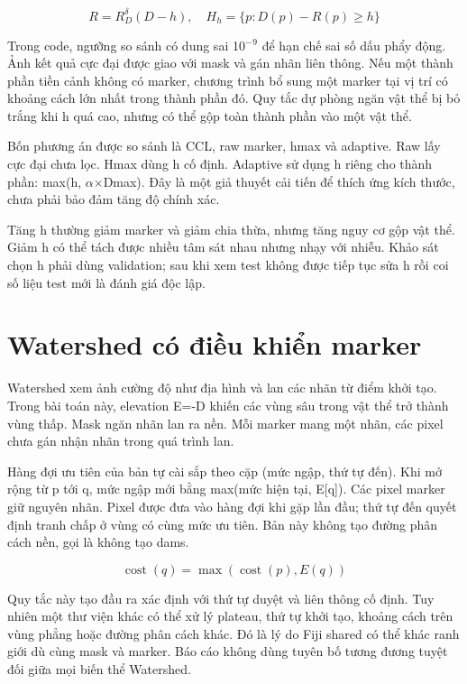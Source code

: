 \documentclass[12pt,a4paper,oneside]{report}
\begin{document}
\begin{equation}R=R_D^\delta(D-h),\quad H_h=\{p:D(p)-R(p)\geq h\}\end{equation}

Trong code, ngưỡng so sánh có dung sai 10\ensuremath{^-}\ensuremath{^9} để hạn chế sai số dấu phẩy động. Ảnh kết quả cực đại được giao với mask và gán nhãn liên thông. Nếu một thành phần tiền cảnh không có marker, chương trình bổ sung một marker tại vị trí có khoảng cách lớn nhất trong thành phần đó. Quy tắc dự phòng ngăn vật thể bị bỏ trắng khi h quá cao, nhưng có thể gộp toàn thành phần vào một vật thể.

Bốn phương án được so sánh là CCL, raw marker, hmax và adaptive. Raw lấy cực đại chưa lọc. Hmax dùng h cố định. Adaptive sử dụng h riêng cho thành phần: max(h, \ensuremath{\alpha}\ensuremath{\times}Dmax). Đây là một giả thuyết cải tiến để thích ứng kích thước, chưa phải bảo đảm tăng độ chính xác.

Tăng h thường giảm marker và giảm chia thừa, nhưng tăng nguy cơ gộp vật thể. Giảm h có thể tách được nhiều tâm sát nhau nhưng nhạy với nhiễu. Khảo sát chọn h phải dùng validation; sau khi xem test không được tiếp tục sửa h rồi coi số liệu test mới là đánh giá độc lập.

\section{Watershed có điều khiển marker}
Watershed xem ảnh cường độ như địa hình và lan các nhãn từ điểm khởi tạo. Trong bài toán này, elevation E=-D khiến các vùng sâu trong vật thể trở thành vùng thấp. Mask ngăn nhãn lan ra nền. Mỗi marker mang một nhãn, các pixel chưa gán nhận nhãn trong quá trình lan.

Hàng đợi ưu tiên của bản tự cài sắp theo cặp (mức ngập, thứ tự đến). Khi mở rộng từ p tới q, mức ngập mới bằng max(mức hiện tại, E[q]). Các pixel marker giữ nguyên nhãn. Pixel được đưa vào hàng đợi khi gặp lần đầu; thứ tự đến quyết định tranh chấp ở vùng có cùng mức ưu tiên. Bản này không tạo đường phân cách nền, gọi là không tạo dams.

\begin{equation}\operatorname{cost}(q)=\max(\operatorname{cost}(p),E(q))\end{equation}

Quy tắc này tạo đầu ra xác định với thứ tự duyệt và liên thông cố định. Tuy nhiên một thư viện khác có thể xử lý plateau, thứ tự khởi tạo, khoảng cách trên vùng phẳng hoặc đường phân cách khác. Đó là lý do Fiji shared có thể khác ranh giới dù cùng mask và marker. Báo cáo không dùng tuyên bố tương đương tuyệt đối giữa mọi biến thể Watershed.
\end{document}

